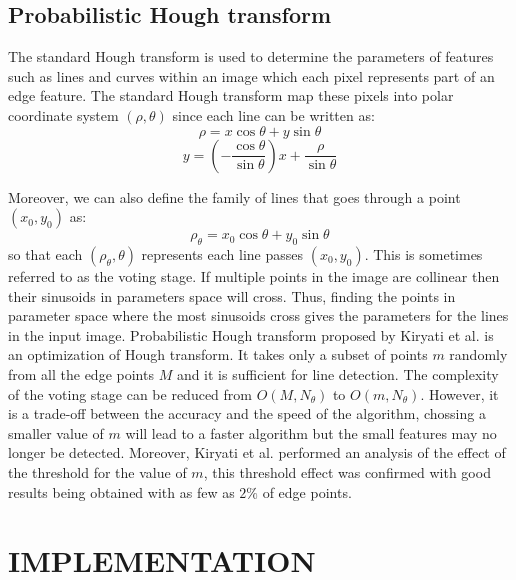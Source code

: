 \documentclass[a4paper,twoside]{article}
\begin{document}
\subsection{Probabilistic Hough transform}
\label{sec:PHT}
The standard Hough transform \cite{duda1971use} is used to determine the parameters of features such as lines and curves within an image which each pixel represents part of an edge feature. The standard Hough transform map these pixels into polar coordinate system $(\rho, \theta)$ since each line can be written as:
\begin{equation}
    \rho = x\cos \theta + y\sin \theta
\end{equation}
\begin{equation}
    y = (-\dfrac{\cos \theta}{\sin \theta})x + \dfrac{\rho}{\sin \theta}
\end{equation}

Moreover, we can also define the family of lines that goes through a point $(x_0, y_0)$ as:
\begin{equation}
    \rho _{\theta} = x_0\cos \theta+y_0\sin \theta 
\end{equation}
so that each $(\rho_{\theta}, \theta)$ represents each line passes $(x_0, y_0)$. This is sometimes referred to as the voting stage. If multiple points in the image are collinear then their sinusoids in parameters space will cross. Thus, finding the points in parameter space where the most sinusoids cross gives the parameters for the lines in the input image. 
Probabilistic Hough transform proposed by Kiryati et al. \cite{kiryati1991probabilistic} is an optimization of Hough transform. It takes only a subset of points $m$ randomly from all the edge points $M$ and it is sufficient for line detection. The complexity of the voting stage can be reduced from $O(M,N_{\theta})$ to $O(m, N_{\theta})$. However, it is a trade-off between the accuracy and the speed of the algorithm, chossing a smaller value of $m$ will lead to a faster algorithm but the small features may no longer be detected. Moreover, Kiryati et al. performed an analysis of the effect of the threshold for the value of $m$, this threshold effect was confirmed with good results being obtained with as few as $2\%$ of edge points.

\section{\uppercase{Implementation}}
\end{document}
